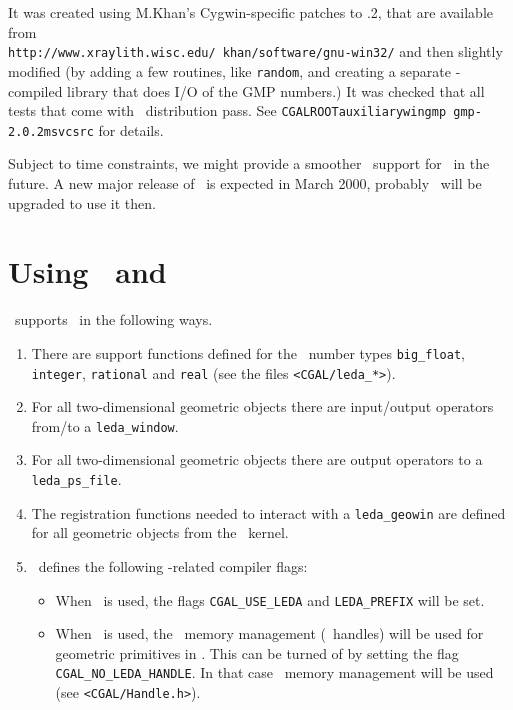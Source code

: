 It was created using M.Khan's Cygwin-specific patches to  .2,
that are available from\\
\texttt{http://www.xraylith.wisc.edu/~khan/software/gnu-win32/} and then
slightly modified (by adding a few routines, like 
\texttt{random}, and creating a
separate -compiled library that does I/O of the GMP numbers.)  It
was checked that all tests that come with \gmp\ distribution pass.
See \texttt{CGALROOT\bslsh auxiliary\bslsh wingmp\bslsh
  gmp-2.0.2\bslsh msvc\bslsh src} for details.

Subject to time constraints, we might provide a smoother \gmp\ support
for \msvc\ in the future. A new major release of \msvc\ is expected in
March 2000, probably \cgal\ will be upgraded to use it then.

\lcTex{\begin{appendix}}

\section{Using \cgal\ and \leda}\label{sec:leda}
\cgal\ supports \leda\ in the following ways.

\begin{enumerate}
\item There are support functions defined for the \leda\ number types
  \texttt{big\_float}, \texttt{integer}, \texttt{rational} and
  \texttt{real} (see the files \texttt{<CGAL/leda\_*>}).
\item For all two-dimensional geometric objects there are input/output
  operators from/to a \texttt{leda\_window}.
\item For all two-dimensional geometric objects there are output
  operators to a \texttt{leda\_ps\_file}.
\item The registration functions needed to interact with a
  \texttt{leda\_geowin} are defined for all geometric objects from the
  \cgal\ kernel.
\item \cgal\ defines the following \leda-related compiler flags:
\begin{itemize}
\item When \leda\ is used, the flags \texttt{CGAL\_USE\_LEDA} and
  \texttt{LEDA\_PREFIX} will be set.
\item When \leda\ is used, the \leda\ memory management (\leda\ 
  handles) will be used for geometric primitives in \cgal. This can be
  turned of by setting the flag \texttt{CGAL\_NO\_LEDA\_HANDLE}. In
  that case \cgal\ memory management will be used (see
  \texttt{<CGAL/Handle.h>}).
\end{itemize}
\end{enumerate}


